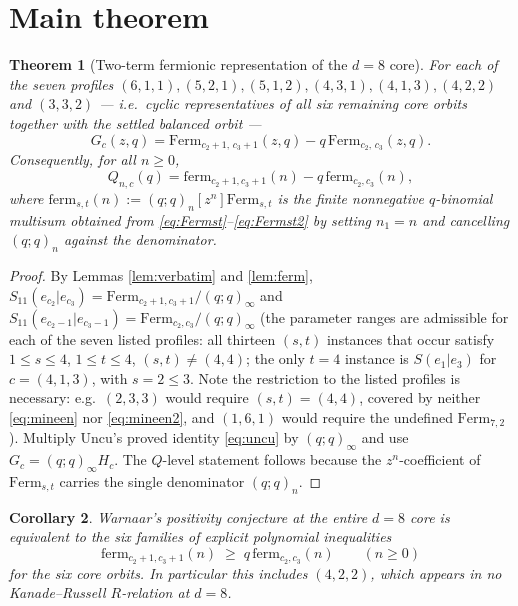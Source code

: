 \documentclass[11pt]{article}
\newtheorem{theorem}{Theorem}
\newtheorem{corollary}[theorem]{Corollary}
\newcommand{\poch}[1]{(q;q)_{#1}}
\newcommand{\Ferm}{\mathrm{Ferm}}
\begin{document}
\section{Main theorem}

\begin{theorem}[Two-term fermionic representation of the $d=8$ core]
\label{thm:main}
For each of the seven profiles
$(6,1,1),(5,2,1),(5,1,2),(4,3,1),(4,1,3),(4,2,2)$ and $(3,3,2)$ --- i.e.\
cyclic representatives of all six remaining core orbits together with the
settled balanced orbit ---
\[
G_c(z,q)=\Ferm_{c_2+1,\,c_3+1}(z,q)-q\,\Ferm_{c_2,\,c_3}(z,q).
\]
Consequently, for all $n\ge 0$,
\[
Q_{n,c}(q)=\mathrm{ferm}_{c_2+1,c_3+1}(n)-q\,\mathrm{ferm}_{c_2,c_3}(n),
\]
where $\mathrm{ferm}_{s,t}(n):=\poch{n}[z^n]\Ferm_{s,t}$ is the finite
nonnegative $q$-binomial multisum obtained from
\eqref{eq:Fermst}--\eqref{eq:Fermst2} by setting $n_1=n$ and cancelling
$\poch{n}$ against the denominator.
\end{theorem}

\begin{proof}
By Lemmas \ref{lem:verbatim} and \ref{lem:ferm},
$S_{11}(e_{c_2}|e_{c_3})=\Ferm_{c_2+1,c_3+1}/(q;q)_\infty$ and
$S_{11}(e_{c_2-1}|e_{c_3-1})=\Ferm_{c_2,c_3}/(q;q)_\infty$ (the parameter
ranges are admissible for each of the seven listed profiles: all thirteen
$(s,t)$ instances that occur satisfy $1\le s\le4$, $1\le t\le4$,
$(s,t)\ne(4,4)$; the only $t=4$ instance is $S(e_1|e_3)$ for $c=(4,1,3)$,
with $s=2\le 3$. Note the restriction to the listed profiles is necessary:
e.g.\ $(2,3,3)$ would require $(s,t)=(4,4)$, covered by neither
\eqref{eq:mineen} nor \eqref{eq:mineen2}, and $(1,6,1)$ would require the
undefined $\Ferm_{7,2}$).
Multiply Uncu's proved identity \eqref{eq:uncu} by $(q;q)_\infty$ and use
$G_c=(q;q)_\infty H_c$. The $Q$-level statement follows because the
$z^n$-coefficient of $\Ferm_{s,t}$ carries the single denominator
$\poch{n}$.
\end{proof}

\begin{corollary}\label{cor:reduction}
Warnaar's positivity conjecture at the entire $d=8$ core is equivalent to
the six families of explicit polynomial inequalities
\[
\mathrm{ferm}_{c_2+1,c_3+1}(n)\;\ge\;q\,\mathrm{ferm}_{c_2,c_3}(n)
\qquad(n\ge0)
\]
for the six core orbits. In particular this includes $(4,2,2)$, which
appears in no Kanade--Russell $R$-relation at $d=8$.
\end{corollary}
\end{document}
